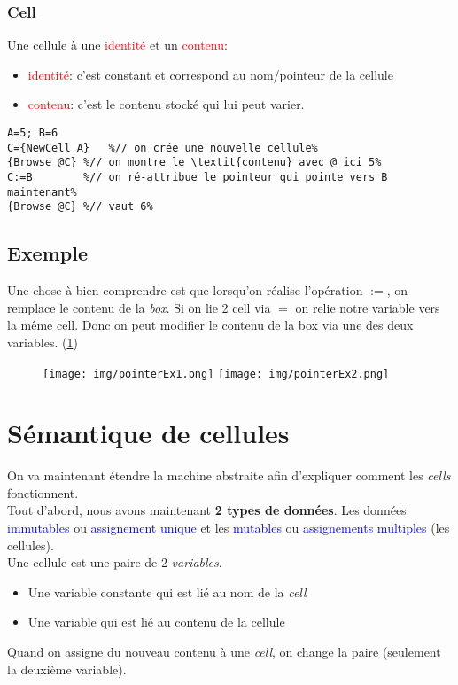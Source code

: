 \documentclass{report}
\begin{document}
\subsubsection{Cell}
Une cellule à une \textcolor{red}{identité} et un \textcolor{red}{contenu}:

\begin{itemize}
\item \textcolor{red}{identité}: c'est constant et correspond au nom/pointeur de la cellule 
\item \textcolor{red}{contenu}: c'est le contenu stocké qui lui peut varier.
\end{itemize}

\begin{lstlisting}[escapechar=\%]
A=5; B=6
C={NewCell A}	%// on crée une nouvelle cellule%
{Browse @C}	%// on montre le \textit{contenu} avec @ ici 5%
C:=B		%// on ré-attribue le pointeur qui pointe vers B maintenant%
{Browse @C}	%// vaut 6%
\end{lstlisting}

\subsection{Exemple}
Une chose à bien comprendre est que lorsqu'on réalise l'opération $:=$, on remplace le contenu de la \textit{box}. Si on lie 2 cell via $=$ on relie notre variable vers la même cell. Donc on peut modifier le contenu de la box via une des deux variables. (\ref{pointerEx1})
\begin{figure}[H]
\centering
\texttt{[image: img/pointerEx1.png]} \label{pointerEx1}
\texttt{[image: img/pointerEx2.png]}
\end{figure}

\section{Sémantique de cellules}
On va maintenant étendre la machine abstraite afin d'expliquer comment les \textit{cells} fonctionnent.\\
Tout d'abord, nous avons maintenant \textbf{2 types de données}. Les données \textcolor{blue}{immutables} ou \textcolor{blue}{assignement unique} et les \textcolor{blue}{mutables} ou \textcolor{blue}{assignements multiples} (les cellules).\\
Une cellule est une paire de 2 \textit{variables}.
\begin{itemize}
\item Une variable constante qui est lié au nom de la \textit{cell}
\item Une variable qui est lié au contenu de la cellule
\end{itemize}
Quand on assigne du nouveau contenu à une \textit{cell}, on change la paire (seulement la deuxième variable).\\
\end{document}

